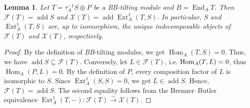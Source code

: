 \documentclass[reqno,12pt]{amsart}
\numberwithin{equation}{section}
\theoremstyle{plain}
\newtheorem{lemma}[theorem]{\bf Lemma}
\theoremstyle{definition}
\begin{document}
\begin{lemma}\label{unique}
Let $T=\tau_A^{-1}S\oplus P$ be a BB-tilting module and
$B=\operatorname{End}_A T$. Then
\(
\mathcal F(T)=\operatorname{add}S\) and
\(\mathcal X(T)=\operatorname{add}\operatorname{Ext}_A^1(T,S).
\)
In particular, $S$ and $\operatorname{Ext}_A^1(T,S)$ are, up to
isomorphism, the unique indecomposable objects of $\mathcal F(T)$ and
$\mathcal X(T)$, respectively.
\end{lemma}
\begin{proof}
By the definition of {\em BB}-tilting modules, we get
$\operatorname{Hom}_A(T,S)=0$. Thus, we have
$\operatorname{add}S\subseteq\mathcal F(T)$. Conversely, let
$L\in\mathcal F(T)$, i.e. $\mbox{\rm Hom}_A(T,L)=0$, thus $\operatorname{Hom}_A(P,L)=0$. By the definition of $P$, every composition
factor of $L$ is isomorphic to $S$. Since
$\operatorname{Ext}_A^1(S,S)=0$, we get
$L\in\operatorname{add}S$. Hence,
$\mathcal F(T)=\operatorname{add}S$. The second equality follows from the Brenner--Butler equivalence
\(
\operatorname{Ext}_A^1(T,-):
\mathcal F(T)\xrightarrow{\sim}\mathcal X(T).
\)

\end{proof}
\end{document}
